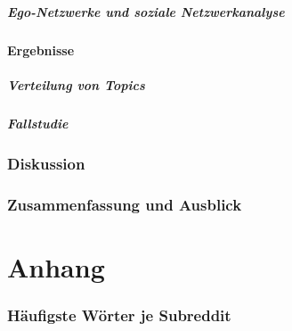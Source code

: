 \documentclass[11pt,a4paper,twoside]{article}
\begin{document}
\hypertarget{ego-netzwerke-und-soziale-netzwerkanalyse}{%
\subsubsection{Ego-Netzwerke und soziale
Netzwerkanalyse}\label{ego-netzwerke-und-soziale-netzwerkanalyse}}

\hypertarget{ergebnisse}{%
\subsection{Ergebnisse}\label{ergebnisse}}

\hypertarget{verteilung-von-topics}{%
\subsubsection{Verteilung von Topics}\label{verteilung-von-topics}}

\hypertarget{fallstudie}{%
\subsubsection{Fallstudie}\label{fallstudie}}

\cleardoublepage

\hypertarget{diskussion}{%
\section{Diskussion}\label{diskussion}}

\cleardoublepage

\hypertarget{zusammenfassung-und-ausblick}{%
\section{Zusammenfassung und
Ausblick}\label{zusammenfassung-und-ausblick}}

\cleardoublepage

\hypertarget{part-anhang}{%
\part*{Anhang}\label{part-anhang}}


\hypertarget{appendix-anhang}{%
\appendix}


\hypertarget{haufigste-worter-je-subreddit}{%
\section{Häufigste Wörter je
Subreddit}\label{haufigste-worter-je-subreddit}}
\end{document}
